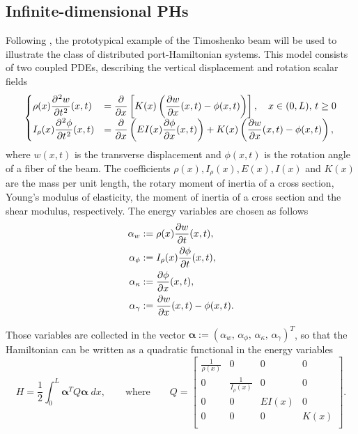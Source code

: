 \documentclass[preprint,12pt]{elsarticle}
\begin{document}
\subsection{Infinite-dimensional PHs}
Following \cite{LeGorrec2005}, the prototypical example of the Timoshenko beam will be used to illustrate the class of distributed port-Hamiltonian systems. This model consists of two coupled PDEs, describing the vertical displacement and rotation scalar fields
\begin{equation}
\begin{cases}
\displaystyle \rho(x) \diffp[2]{w}{t}(x,t) &= \displaystyle \diffp{}{x} \left[K(x) \left(\diffp{w}{x}(x,t) - \phi(x,t)\right)\right], \quad x \in (0,L),\, t \ge 0 \\
\displaystyle I_{\rho}(x) \diffp[2]{\phi}{t}(x,t) &= \displaystyle \diffp{}{x} \left(EI(x) \diffp{ \phi}{x}(x,t)\right) + K(x) \left(\diffp{w}{x}(x,t) - \phi(x,t) \right),
\end{cases}
\end{equation}
where ${w}(x,t)$ is the transverse displacement and $\phi(x,t)$ is the rotation angle of a fiber of the beam. The coefficients $\rho(x), I_{\rho}(x), E(x), I(x)$ and $K(x)$ are the mass per unit length, the rotary moment of inertia of a cross section, Young's modulus of elasticity, the moment of inertia of a cross section and the shear modulus, respectively. The energy variables are chosen as follows
\begin{equation}
\begin{aligned}
\alpha_{w} &:= \rho(x) \diffp{w}{t}(x,t), \\
\alpha_{\phi} &:= I_{\rho}(x) \diffp{\phi}{t}(x,t), \\
\alpha_{\kappa} &:= \diffp{\phi}{x}(x,t), \\
\alpha_{\gamma} &:= \diffp{w}{x}(x,t) - \phi(x,t). \\
\end{aligned}
\end{equation}

Those variables are collected in the vector $\bm{\alpha} := (\alpha_{w}, \, \alpha_{\phi}, \, \alpha_{\kappa}, \, \alpha_{\gamma} )^T $, so that the Hamiltonian can be written as a quadratic functional in the energy variables 
\begin{equation}
H = \frac{1}{2} \int_{0}^{L} \bm{\alpha}^T Q \bm{\alpha} \; dx,
\qquad \text{where} \qquad
Q = 
\begin{bmatrix}
\frac{1}{\rho(x)} & 0 & 0 & 0 \\
0 & \frac{1}{I_{\rho}(x)} & 0 & 0 \\
0 & 0 & EI(x) & 0 \\
0 & 0 & 0 & K(x) \\
\end{bmatrix}.
\end{equation}
\end{document}
